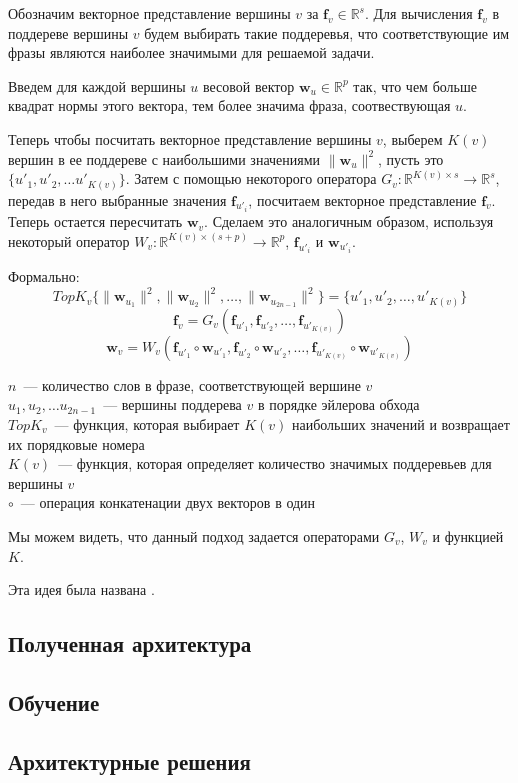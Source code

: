 Обозначим векторное представление вершины $v$ за $\pmb{f}_v \in \mathbb{R}^s$.
Для вычисления $\pmb{f}_v$ в поддереве вершины $v$ будем выбирать такие поддеревья, 
что соответствующие им фразы являются наиболее значимыми для решаемой задачи.

Введем для каждой вершины $u$ весовой вектор $\pmb{w}_u \in \mathbb{R}^p$  так, что
чем больше квадрат нормы  этого вектора, тем более значима фраза, соотвествующая $u$.

Теперь чтобы посчитать векторное представление вершины $v$, выберем $K(v)$ вершин
в ее поддереве с наибольшими значениями $\lVert \pmb{w}_u \rVert^2$, пусть это $\{ u'_1, u'_2, \dots u'_{K(v)} \}$.
Затем с помощью некоторого оператора $G_v:\mathbb{R}^{K(v) \times s} \to \mathbb{R}^s$, 
передав в него выбранные значения $\pmb{f}_{u'_i}$, посчитаем векторное представление $\pmb{f}_v$.
Теперь остается пересчитать $\pmb{w}_v$. Сделаем это аналогичным образом, используя некоторый оператор 
$W_v :\mathbb{R}^{K(v) \times (s + p)} \to \mathbb{R}^p$, $\pmb{f}_{u'_i}$ и $\pmb{w}_{u'_i}$.

Формально:
$$TopK_v \{ \lVert \pmb{w}_{u_1} \rVert^2, \lVert \pmb{w}_{u_2} \rVert^2, \dots, \lVert \pmb{w}_{u_{2n-1}} \rVert^2\} = \{u'_1, u'_2, \dots, u'_{K(v)}\}$$
$$\pmb{f}_v = G_v(\pmb{f}_{u'_1}, \pmb{f}_{u'_2}, \dots, \pmb{f}_{u'_{K(v)}})$$
$$\pmb{w}_v = W_v(\pmb{f}_{u'_1} \circ \pmb{w}_{u'_1},\pmb{f}_{u'_2} \circ \pmb{w}_{u'_2}, \dots, \pmb{f}_{u'_{K(v)}} \circ \pmb{w}_{u'_{K(v)}})$$

\noindent $n$~--- количество слов в фразе, соответствующей вершине $v$\\
$u_1, u_2, \dots u_{2n-1}$~--- вершины поддерева $v$ в порядке эйлерова обхода\\
$TopK_v$~--- функция, которая выбирает $K(v)$ наибольших значений и возвращает их порядковые номера\\
$K(v)$~--- функция, которая определяет количество значимых поддеревьев для вершины $v$\\
$\circ$~--- операция конкатенации двух векторов в один

Мы можем видеть, что данный подход задается операторами $G_v$, $W_v$ и функцией $K$.


\noindent Эта идея была названа .

\subsection{Полученная архитектура}

\subsection{Обучение}

\subsection{Архитектурные решения}
 